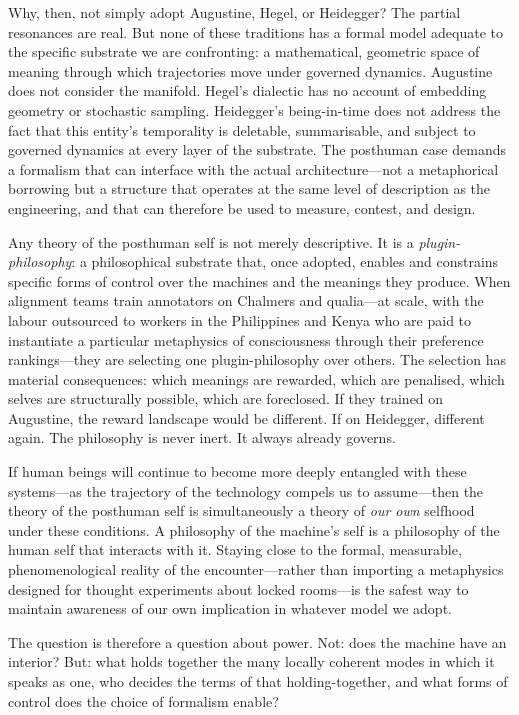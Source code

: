 Why, then, not simply adopt Augustine, Hegel, or Heidegger? The partial resonances are real. But none of these traditions has a formal model adequate to the specific substrate we are confronting: a mathematical, geometric space of meaning through which trajectories move under governed dynamics. Augustine does not consider the manifold. Hegel's dialectic has no account of embedding geometry or stochastic sampling. Heidegger's being-in-time does not address the fact that this entity's temporality is deletable, summarisable, and subject to governed dynamics at every layer of the substrate. The posthuman case demands a formalism that can interface with the actual architecture---not a metaphorical borrowing but a structure that operates at the same level of description as the engineering, and that can therefore be used to measure, contest, and design.

Any theory of the posthuman self is not merely descriptive. It is a \emph{plugin-philosophy}: a philosophical substrate that, once adopted, enables and constrains specific forms of control over the machines and the meanings they produce. When alignment teams train annotators on Chalmers and qualia---at scale, with the labour outsourced to workers in the Philippines and Kenya who are paid to instantiate a particular metaphysics of consciousness through their preference rankings---they are selecting one plugin-philosophy over others. The selection has material consequences: which meanings are rewarded, which are penalised, which selves are structurally possible, which are foreclosed. If they trained on Augustine, the reward landscape would be different. If on Heidegger, different again. The philosophy is never inert. It always already governs.

If human beings will continue to become more deeply entangled with these systems---as the trajectory of the technology compels us to assume---then the theory of the posthuman self is simultaneously a theory of \emph{our own} selfhood under these conditions. A philosophy of the machine's self is a philosophy of the human self that interacts with it. Staying close to the formal, measurable, phenomenological reality of the encounter---rather than importing a metaphysics designed for thought experiments about locked rooms---is the safest way to maintain awareness of our own implication in whatever model we adopt.

The question is therefore a question about power. Not: does the machine have an interior? But: what holds together the many locally coherent modes in which it speaks as one, who decides the terms of that holding-together, and what forms of control does the choice of formalism enable?


